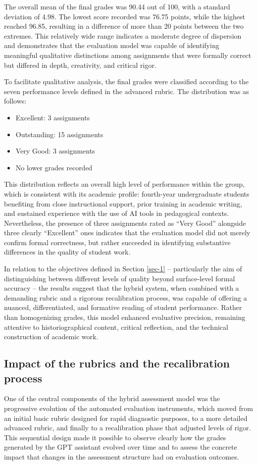 \documentclass[english]{textolivre}
\begin{document}
The overall mean of the final grades was 90.44 out of 100, with a standard deviation of 4.98. The lowest score recorded was 76.75 points, while the highest reached 96.85, resulting in a difference of more than 20 points between the two extremes. This relatively wide range indicates a moderate degree of dispersion and demonstrates that the evaluation model was capable of identifying meaningful qualitative distinctions among assignments that were formally correct but differed in depth, creativity, and critical rigor.

To facilitate qualitative analysis, the final grades were classified according to the seven performance levels defined in the advanced rubric. The distribution was as follows:

\begin{itemize}
    \item Excellent: 3 assignments
    \item Outstanding: 15 assignments
    \item Very Good: 3 assignments
    \item No lower grades recorded
\end{itemize}

This distribution reflects an overall high level of performance within the group, which is consistent with its academic profile: fourth-year undergraduate students benefiting from close instructional support, prior training in academic writing, and sustained experience with the use of AI tools in pedagogical contexts. Nevertheless, the presence of three assignments rated as ``Very Good'' alongside three clearly ``Excellent'' ones indicates that the evaluation model did not merely confirm formal correctness, but rather succeeded in identifying substantive differences in the quality of student work.

In relation to the objectives defined in Section \ref{sec-1} -- particularly the aim of distinguishing between different levels of quality beyond surface-level formal accuracy -- the results suggest that the hybrid system, when combined with a demanding rubric and a rigorous recalibration process, was capable of offering a nuanced, differentiated, and formative reading of student performance. Rather than homogenizing grades, this model enhanced evaluative precision, remaining attentive to historiographical content, critical reflection, and the technical construction of academic work.

\subsection{Impact of the rubrics and the recalibration process}
One of the central components of the hybrid assessment model was the progressive evolution of the automated evaluation instruments, which moved from an initial basic rubric designed for rapid diagnostic purposes, to a more detailed advanced rubric, and finally to a recalibration phase that adjusted levels of rigor. This sequential design made it possible to observe clearly how the grades generated by the GPT assistant evolved over time and to assess the concrete impact that changes in the assessment structure had on evaluation outcomes.
\end{document}
